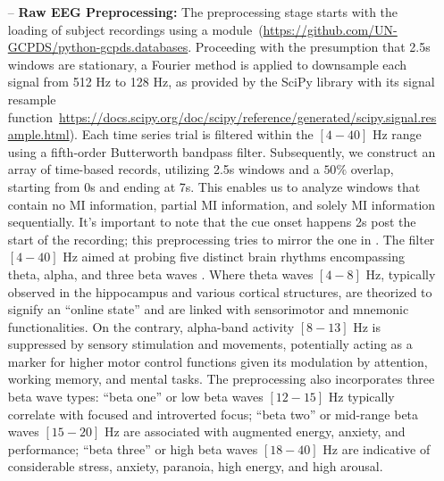 \begin{itemize}

    \item[--] \textbf{Raw EEG Preprocessing:} The preprocessing stage starts with the loading of subject recordings using a  module~(\url{https://github.com/UN-GCPDS/python-gcpds.databases}. Proceeding with the presumption that 2.5s windows are stationary, a Fourier method is applied to downsample each signal from 512 Hz to 128 Hz, as provided by the SciPy library with its signal resample function~\url{https://docs.scipy.org/doc/scipy/reference/generated/scipy.signal.resample.html}). Each time series trial is filtered within the $[4-40]$ Hz range using a fifth-order Butterworth bandpass filter. Subsequently, we construct an array of time-based records, utilizing 2.5s windows and a $50\%$ overlap, starting from 0s and ending at 7s. This enables us to analyze windows that contain no MI information, partial MI information, and solely MI information sequentially. It's important to note that the cue onset happens 2s post the start of the recording; this preprocessing tries to mirror the one in \cite{lawhern2018eegnet}. The filter $[4-40]$ Hz aimed at probing five distinct brain rhythms encompassing theta, alpha, and three beta waves \cite{ABHANG201651}. Where theta waves $[4-8]$ Hz, typically observed in the hippocampus and various cortical structures, are theorized to signify an ``online state'' and are linked with sensorimotor and mnemonic functionalities. On the contrary, alpha-band activity $[8-13]$ Hz is suppressed by sensory stimulation and movements, potentially acting as a marker for higher motor control functions given its modulation by attention, working memory, and mental tasks. The preprocessing also incorporates three beta wave types: ``beta one'' or low beta waves $[12-15]$ Hz typically correlate with focused and introverted focus; ``beta two'' or mid-range beta waves $[15-20]$ Hz are associated with augmented energy, anxiety, and performance; ``beta three'' or high beta waves $[18-40]$ Hz are indicative of considerable stress, anxiety, paranoia, high energy, and high arousal.


\end{itemize}
